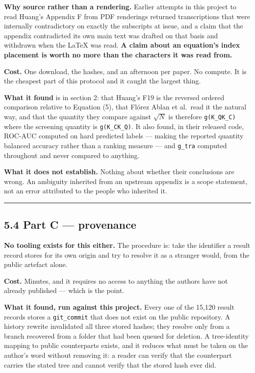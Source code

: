 \documentclass[
  10pt,
]{article}
\begin{document}
\textbf{Why source rather than a rendering.} Earlier attempts in this
project to read Huang's Appendix F from PDF renderings returned
transcriptions that were internally contradictory on exactly the
subscripts at issue, and a claim that the appendix contradicted its own
main text was drafted on that basis and withdrawn when the LaTeX was
read. \textbf{A claim about an equation's index placement is worth no
more than the characters it was read from.}

\textbf{Cost.} One download, the hashes, and an afternoon per paper. No
compute. It is the cheapest part of this protocol and it caught the
largest thing.

\textbf{What it found} is in section 2: that Huang's F19 is the reversed
ordered comparison relative to Equation (5), that Flórez Ablan et
al.~read it the natural way, and that the quantity they compare against
\(\sqrt{N}\) is therefore \texttt{g(K\_\allowbreak{}Q\textbar{}\textbar{}K\_C)} where
the screening quantity is \texttt{g(K\_\allowbreak{}C\textbar{}\textbar{}K\_Q)}. It
also found, in their released code, ROC-AUC computed on hard predicted
labels --- making the reported quantity balanced accuracy rather than a
ranking measure --- and \texttt{g\_\allowbreak{}tra} computed throughout and never
compared to anything.

\textbf{What it does not establish.} Nothing about whether their
conclusions are wrong. An ambiguity inherited from an upstream appendix
is a scope statement, not an error attributed to the people who
inherited it.

\begin{center}\rule{0.5\linewidth}{0.5pt}\end{center}

\subsection{5.4 Part C --- provenance}\label{part-c-provenance}

\textbf{No tooling exists for this either.} The procedure is: take the
identifier a result record stores for its own origin and try to resolve
it as a stranger would, from the public artefact alone.

\textbf{Cost.} Minutes, and it requires no access to anything the
authors have not already published --- which is the point.

\textbf{What it found, run against this project.} Every one of the
15,120 result records stores a \texttt{git\_\allowbreak{}commit} that does not exist
on the public repository. A history rewrite invalidated all three stored
hashes; they resolve only from a branch recovered from a folder that had
been queued for deletion. A tree-identity mapping to public counterparts
exists, and it reduces what must be taken on the author's word without
removing it: a reader can verify that the counterpart carries the stated
tree and cannot verify that the stored hash ever did.
\end{document}
